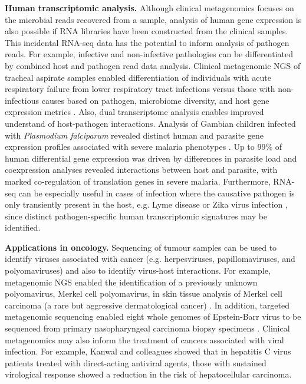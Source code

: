 \textbf{Human transcriptomic analysis.} Although clinical metagenomics focuses on the microbial reads recovered from a sample, analysis of human gene expression is also possible if RNA libraries have been constructed from the clinical samples. This incidental RNA-seq data has the potential to inform analysis of pathogen reads. For example, infective and non-infective pathologies can be differentiated by combined host and pathogen read data analysis. Clinical metagenomic NGS of tracheal aspirate samples enabled differentiation of individuals with acute respiratory failure from lower respiratory tract infections versus those with non-infectious causes based on pathogen, microbiome diversity, and host gene expression metrics \parencite{Langelier2018a}. Also, dual transcriptome analysis enables improved understand of host-pathogen interactions. Analysis of Gambian children infected with \textit{Plasmodium falciparum} revealed distinct human and parasite gene expression profiles associated with severe malaria phenotypes \parencite{Lee2018}. Up to 99\% of human differential gene expression was driven by differences in parasite load and coexpression analyses revealed interactions between host and parasite, with marked co-regulation of translation genes in severe malaria. Furthermore, RNA-seq can be especially useful in cases of infection where the causative pathogen is only transiently present in the host, e.g. Lyme disease \parencite{Marques2015} or Zika virus infection \parencite{Landry2017}, since distinct pathogen-specific human transcriptomic signatures may be identified.

\textbf{Applications in oncology.} Sequencing of tumour samples can be used to identify viruses associated with cancer (e.g. herpesviruses, papillomaviruses, and polyomaviruses) and also to identify virus-host interactions. For example, metagenomic NGS enabled the identification of a previously unknown polyomavirus, Merkel cell polyomavirus, in skin tissue analysis of Merkel cell carcinoma (a rare but aggressive dermatological cancer) \parencite{Feng2008}. In addition, targeted metagenomic sequencing enabled eight whole genomes of Epstein-Barr virus to be sequenced from primary nasopharyngeal carcinoma biopsy specimens \parencite{Kwok2014}. Clinical metagenomics may also inform the treatment of cancers associated with viral infection. For example, Kanwal and colleagues \parencite{Kanwal2017} showed that in hepatitis C virus patients treated with direct-acting antiviral agents, those with sustained virological response showed a reduction in the risk of hepatocellular carcinoma.

